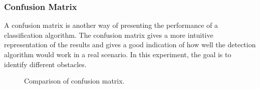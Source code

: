\documentclass[sensors,article,submit,moreauthors,pdftex]{Definitions/mdpi}
\begin{document}
\begin{paracol}{2}
\begin{table}[htbp]
\begin{tabular}{llcc}
\bottomrule
\end{tabular}
\label{tbl:Comparison of AP in different dataset}
\end{table}

\subsubsection{Confusion Matrix}
A confusion matrix is another way of presenting the performance of a classification algorithm. The confusion matrix gives a more intuitive representation of the results and gives a good indication of how well the detection algorithm would work in a real scenario. In this experiment, the goal is to identify different obstacles.

\begin{figure}[htbp]
\centering
{}
\quad
{}
\caption{Comparison of confusion matrix.}
\label{fig:confusion matrix}
\end{figure}


\end{paracol}
\end{document}
